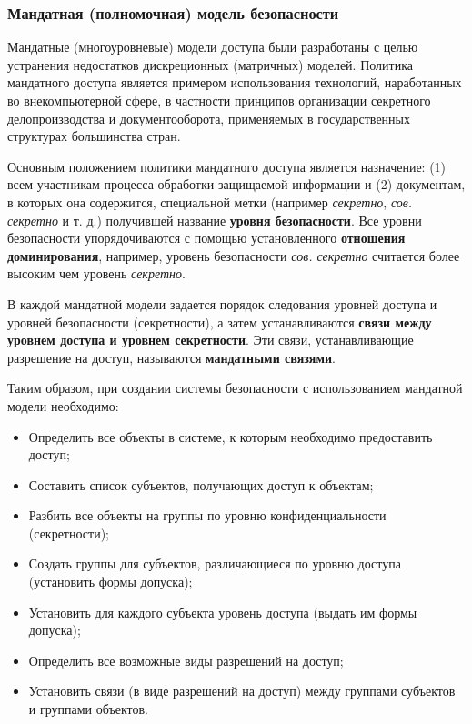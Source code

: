 \subsubsection{Мандатная (полномочная) модель безопасности}

Мандатные (многоуровневые) модели доступа были разработаны с целью устранения недостатков дискреционных 
(матричных) моделей. Политика мандатного доступа является примером использования технологий, 
наработанных во внекомпьютерной сфере, в частности принципов организации секретного делопроизводства 
и документооборота, применяемых в государственных структурах большинства стран.

Основным положением политики мандатного доступа является назначение: (1) всем участникам процесса 
обработки защищаемой информации и (2) документам, в которых она содержится, специальной метки 
(например \textit{секретно}, \textit{сов. секретно} и т. д.) получившей название \textbf{уровня безопасности}. 
Все уровни безопасности упорядочиваются с помощью установленного \textbf{отношения
доминирования}, например, уровень безопасности \textit{сов. секретно} считается более высоким чем
уровень \textit{секретно}.

В каждой мандатной модели задается порядок следования уровней доступа и уровней безопасности (секретности), 
а затем устанавливаются \textbf{связи между уровнем доступа и уровнем секретности}. Эти связи, 
устанавливающие разрешение на доступ, называются \textbf{мандатными связями}.

Таким образом, при создании системы безопасности с использованием мандатной модели необходимо:
\begin{itemize}
    \item Определить все объекты в системе, к которым необходимо предоставить доступ;
    \item Составить список субъектов, получающих доступ к объектам;
    \item Разбить все объекты на группы по уровню конфиденциальности (секретности);
    \item Создать группы для субъектов, различающиеся по уровню доступа (установить формы допуска);
    \item Установить для каждого субъекта уровень доступа (выдать им формы допуска);
    \item Определить все возможные виды разрешений на доступ;
    \item Установить связи (в виде разрешений на доступ) между группами субъектов и группами объектов.
\end{itemize}

